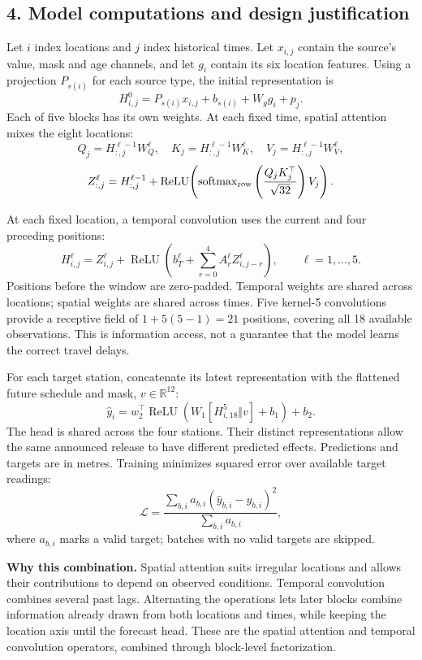 \subsection*{4. Model computations and design justification}
Let $i$ index locations and $j$ index historical times. Let $x_{i,j}$ contain the source's value, mask and age channels, and let $g_i$ contain its six location features. Using a projection $P_{s(i)}$ for each source type, the initial representation is
\[
H^0_{i,j}=P_{s(i)}x_{i,j}+b_{s(i)}+W_g g_i+p_j.
\]
Each of five blocks has its own weights. At each fixed time, spatial attention mixes the eight locations:
\[
Q_j=H^{\ell-1}_{:,j}W_Q^\ell,\quad
K_j=H^{\ell-1}_{:,j}W_K^\ell,\quad
V_j=H^{\ell-1}_{:,j}W_V^\ell,
\]
\[
Z^\ell_{:,j}=H^{\ell-1}_{:,j}
+\operatorname{ReLU}\!\left(\operatorname{softmax}_{\rm row}
\left(\frac{Q_jK_j^\top}{\sqrt{32}}\right)V_j\right).
\]

\clearpage
At each fixed location, a temporal convolution uses the current and four preceding positions:
\[
H^\ell_{i,j}=Z^\ell_{i,j}
+\operatorname{ReLU}\!\left(b_T^\ell+
\sum_{r=0}^{4} A_r^\ell Z^\ell_{i,j-r}\right),
\qquad \ell=1,\ldots,5.
\]
Positions before the window are zero-padded. Temporal weights are shared across locations; spatial weights are shared across times. Five kernel-5 convolutions provide a receptive field of $1+5(5-1)=21$ positions, covering all 18 available observations. This is information access, not a guarantee that the model learns the correct travel delays.

For each target station, concatenate its latest representation with the flattened future schedule and mask, $v\in\mathbb R^{12}$:
\[
\widehat y_i=w_2^\top\operatorname{ReLU}
\left(W_1[H^5_{i,18}\Vert v]+b_1\right)+b_2.
\]
The head is shared across the four stations. Their distinct representations allow the same announced release to have different predicted effects. Predictions and targets are in metres. Training minimizes squared error over available target readings:
\[
\mathcal L=\frac{\sum_{b,i}a_{b,i}(\widehat y_{b,i}-y_{b,i})^2}
{\sum_{b,i}a_{b,i}},
\]
where $a_{b,i}$ marks a valid target; batches with no valid targets are skipped.

\textbf{Why this combination.} Spatial attention suits irregular locations and allows their contributions to depend on observed conditions. Temporal convolution combines several past lags. Alternating the operations lets later blocks combine information already drawn from both locations and times, while keeping the location axis until the forecast head. These are the spatial attention and temporal convolution operators, combined through block-level factorization.

